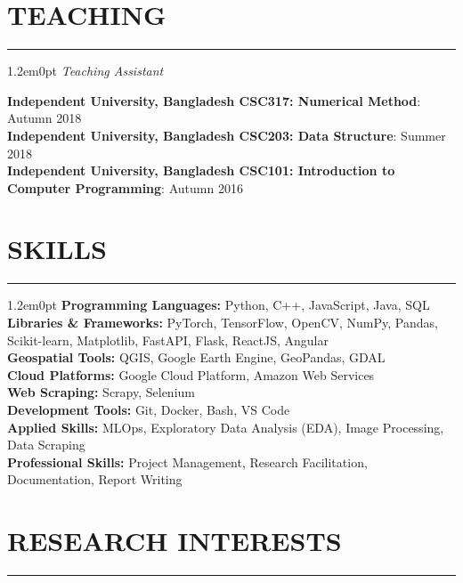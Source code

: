 \documentclass[a4paper,10pt]{article}
\begin{document}
\section*{TEACHING}
\hrule\vspace{0.6em}

\begin{adjustwidth}{1.2em}{0pt}
\textit{Teaching Assistant}

\textbf{Independent University, Bangladesh CSC317: Numerical Method}: Autumn 2018\\
\textbf{Independent University, Bangladesh CSC203: Data Structure}: Summer 2018\\
\textbf{Independent University, Bangladesh CSC101: Introduction to Computer Programming}: Autumn 2016
\end{adjustwidth}

\section*{SKILLS}
\hrule\vspace{0.6em}

\begin{adjustwidth}{1.2em}{0pt}
    \textbf{Programming Languages:} Python, C++, JavaScript, Java, SQL\\
    \textbf{Libraries \& Frameworks:} PyTorch, TensorFlow, OpenCV, NumPy, Pandas, Scikit-learn, Matplotlib, FastAPI, Flask, ReactJS, Angular\\
    \textbf{Geospatial Tools:} QGIS, Google Earth Engine, GeoPandas, GDAL\\
    \textbf{Cloud Platforms:} Google Cloud Platform, Amazon Web Services\\
    \textbf{Web Scraping:} Scrapy, Selenium\\
    \textbf{Development Tools:} Git, Docker, Bash, VS Code\\
    \textbf{Applied Skills:} MLOps, Exploratory Data Analysis (EDA), Image Processing, Data Scraping\\
    \textbf{Professional Skills:} Project Management, Research Facilitation, Documentation, Report Writing
\end{adjustwidth}


\section*{RESEARCH INTERESTS}
\hrule\vspace{0.6em}
\end{document}

